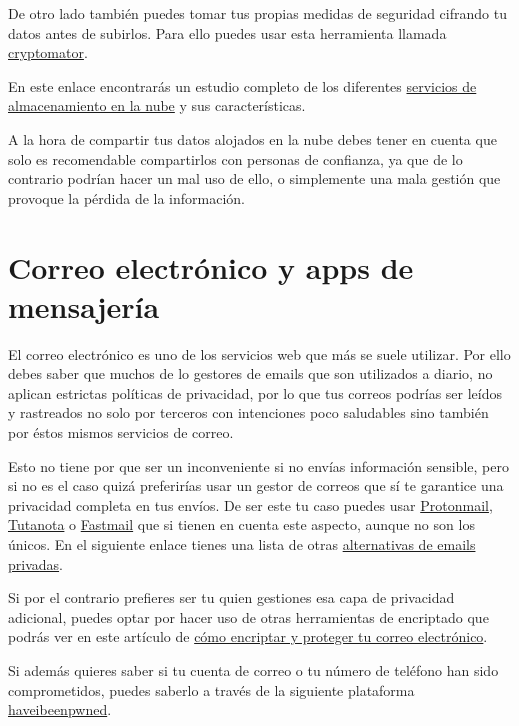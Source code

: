 \documentclass[
  spanish,
  a4paper,
  openany]{book}
\begin{document}
De otro lado también puedes tomar tus propias medidas de seguridad cifrando tu datos antes de subirlos. Para ello puedes usar esta herramienta llamada \href{https://cryptomator.org/}{cryptomator}.

En este enlace encontrarás un estudio completo de los diferentes \href{https://www.osi.es/sites/default/files/docs/osi_servicios_nube.pdf}{servicios de almacenamiento en la nube} y sus características.

A la hora de compartir tus datos alojados en la nube debes tener en cuenta que solo es recomendable compartirlos con personas de confianza, ya que de lo contrario podrían hacer un mal uso de ello, o simplemente una mala gestión que provoque la pérdida de la información.

\hypertarget{correo-electruxf3nico-y-apps-de-mensajeruxeda}{%
\section{Correo electrónico y apps de mensajería}\label{correo-electruxf3nico-y-apps-de-mensajeruxeda}}

El correo electrónico es uno de los servicios web que más se suele utilizar. Por ello debes saber que muchos de lo gestores de emails que son utilizados a diario, no aplican estrictas políticas de privacidad, por lo que tus correos podrías ser leídos y rastreados no solo por terceros con intenciones poco saludables sino también por éstos mismos servicios de correo.

Esto no tiene por que ser un inconveniente si no envías información sensible, pero si no es el caso quizá preferirías usar un gestor de correos que sí te garantice una privacidad completa en tus envíos. De ser este tu caso puedes usar \href{https://protonmail.com/}{Protonmail}, \href{https://tutanota.com/es/}{Tutanota} o \href{https://www.fastmail.com}{Fastmail} que si tienen en cuenta este aspecto, aunque no son los únicos. En el siguiente enlace tienes una lista de otras \href{https://blogthinkbig.com/alternativas-gratuitas-gmail-outlook-privacidad}{alternativas de emails privadas}.

Si por el contrario prefieres ser tu quien gestiones esa capa de privacidad adicional, puedes optar por hacer uso de otras herramientas de encriptado que podrás ver en este artículo de \href{https://www.osi.es/es/actualidad/blog/2019/07/31/como-encriptar-y-proteger-tu-correo-electronico}{cómo encriptar y proteger tu correo electrónico}.

Si además quieres saber si tu cuenta de correo o tu número de teléfono han sido comprometidos, puedes saberlo a través de la siguiente plataforma \href{https://haveibeenpwned.com/}{haveibeenpwned}.
\end{document}
